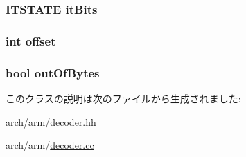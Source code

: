 \label{classArmISA_1_1Decoder_a37c5d55785204b8fd00a8ebf62e1fc33}
\hypertarget{classArmISA_1_1Decoder_a638ffaf97a6fd828d122ad8dbfff2e7b}{
\subsubsection[{itBits}]{\setlength{\rightskip}{0pt plus 5cm}ITSTATE {\bf itBits}}}
\label{classArmISA_1_1Decoder_a638ffaf97a6fd828d122ad8dbfff2e7b}
\hypertarget{classArmISA_1_1Decoder_aed7ea92f45bd273dde380a45ddced592}{
\subsubsection[{offset}]{\setlength{\rightskip}{0pt plus 5cm}int {\bf offset}}}
\label{classArmISA_1_1Decoder_aed7ea92f45bd273dde380a45ddced592}
\hypertarget{classArmISA_1_1Decoder_a281c9bc4944bdbf837d5432478d43273}{
\subsubsection[{outOfBytes}]{\setlength{\rightskip}{0pt plus 5cm}bool {\bf outOfBytes}}}
\label{classArmISA_1_1Decoder_a281c9bc4944bdbf837d5432478d43273}


このクラスの説明は次のファイルから生成されました:\begin{DoxyCompactItemize}
\item 
arch/arm/\hyperlink{arm_2decoder_8hh}{decoder.hh}\item 
arch/arm/\hyperlink{arm_2decoder_8cc}{decoder.cc}\end{DoxyCompactItemize}
